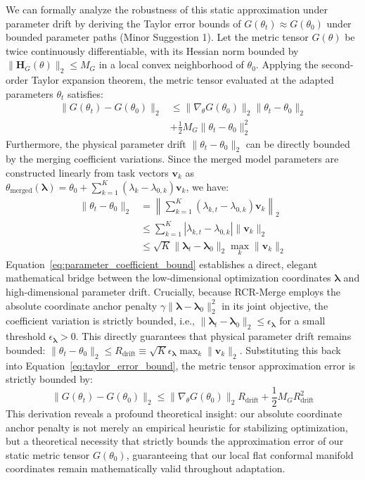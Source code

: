 We can formally analyze the robustness of this static approximation under parameter drift by deriving the Taylor error bounds of $G(\theta_t) \approx G(\theta_0)$ under bounded parameter paths (Minor Suggestion 1). Let the metric tensor $G(\theta)$ be twice continuously differentiable, with its Hessian norm bounded by $\|\mathbf{H}_G(\theta)\|_2 \le M_G$ in a local convex neighborhood of $\theta_0$. Applying the second-order Taylor expansion theorem, the metric tensor evaluated at the adapted parameters $\theta_t$ satisfies:
\begin{align}
\label{eq:taylor_error_bound}
\|G(\theta_t) - G(\theta_0)\|_2 &\le \|\nabla_\theta G(\theta_0)\|_2 \|\theta_t - \theta_0\|_2 \nonumber \\
&+ \frac{1}{2} M_G \|\theta_t - \theta_0\|_2^2
\end{align}
Furthermore, the physical parameter drift $\|\theta_t - \theta_0\|_2$ can be directly bounded by the merging coefficient variations. Since the merged model parameters are constructed linearly from task vectors $\mathbf{v}_k$ as $\theta_{\text{merged}}(\boldsymbol{\lambda}) = \theta_0 + \sum_{k=1}^K (\lambda_k - \lambda_{0,k}) \mathbf{v}_k$, we have:
\begin{align}
\label{eq:parameter_coefficient_bound}
\|\theta_t - \theta_0\|_2 &= \left\| \sum_{k=1}^K (\lambda_{k,t} - \lambda_{0,k}) \mathbf{v}_k \right\|_2 \nonumber \\
&\le \sum_{k=1}^K |\lambda_{k,t} - \lambda_{0,k}| \|\mathbf{v}_k\|_2 \nonumber \\
&\le \sqrt{K} \|\boldsymbol{\lambda}_t - \boldsymbol{\lambda}_0\|_2 \max_k \|\mathbf{v}_k\|_2
\end{align}
Equation~\ref{eq:parameter_coefficient_bound} establishes a direct, elegant mathematical bridge between the low-dimensional optimization coordinates $\boldsymbol{\lambda}$ and high-dimensional parameter drift. Crucially, because RCR-Merge employs the absolute coordinate anchor penalty $\gamma \|\boldsymbol{\lambda} - \boldsymbol{\lambda}_0\|_2^2$ in its joint objective, the coefficient variation is strictly bounded, i.e., $\|\boldsymbol{\lambda}_t - \boldsymbol{\lambda}_0\|_2 \le \epsilon_{\boldsymbol{\lambda}}$ for a small threshold $\epsilon_{\boldsymbol{\lambda}} > 0$. This directly guarantees that physical parameter drift remains bounded: $\|\theta_t - \theta_0\|_2 \le R_{\text{drift}} \equiv \sqrt{K} \epsilon_{\boldsymbol{\lambda}} \max_k \|\mathbf{v}_k\|_2$. Substituting this back into Equation~\ref{eq:taylor_error_bound}, the metric tensor approximation error is strictly bounded by:
\begin{equation}
\label{eq:final_metric_bound}
\|G(\theta_t) - G(\theta_0)\|_2 \le \|\nabla_\theta G(\theta_0)\|_2 R_{\text{drift}} + \frac{1}{2} M_G R_{\text{drift}}^2
\end{equation}
This derivation reveals a profound theoretical insight: our absolute coordinate anchor penalty is not merely an empirical heuristic for stabilizing optimization, but a theoretical necessity that strictly bounds the approximation error of our static metric tensor $G(\theta_0)$, guaranteeing that our local flat conformal manifold coordinates remain mathematically valid throughout adaptation.

